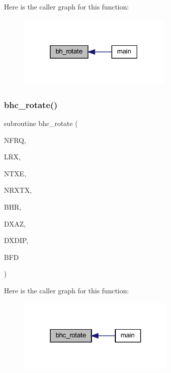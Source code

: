 Here is the caller graph for this function\+:
\nopagebreak
\begin{figure}[H]
\begin{center}
\leavevmode
\includegraphics[width=211pt]{Marco_8f90_a6f9b11cb7ed99f525d6b03e1b3223dee_icgraph}
\end{center}
\end{figure}
\mbox{\label{Marco_8f90_a88bc2c0947b2f1babf4dade8ee684423}} 
\subsubsection{\texorpdfstring{bhc\+\_\+rotate()}{bhc\_rotate()}}
{\footnotesize\ttfamily subroutine bhc\+\_\+rotate (\begin{DoxyParamCaption}\item[{integer}]{N\+F\+RQ,  }\item[{integer}]{L\+RX,  }\item[{integer}]{N\+T\+XE,  }\item[{integer, dimension(ntxe)}]{N\+R\+X\+TX,  }\item[{logical, dimension(lrx,ntxe)}]{B\+HR,  }\item[{real, dimension(lrx,ntxe)}]{D\+X\+AZ,  }\item[{real, dimension(lrx,ntxe)}]{D\+X\+D\+IP,  }\item[{complex, dimension(nfrq,lrx,ntxe,3)}]{B\+FD }\end{DoxyParamCaption})}

Here is the caller graph for this function\+:
\nopagebreak
\begin{figure}[H]
\begin{center}
\leavevmode
\includegraphics[width=216pt]{Marco_8f90_a88bc2c0947b2f1babf4dade8ee684423_icgraph}
\end{center}
\end{figure}
\mbox{\label{Marco_8f90_a0df391e311aae0e0ab61a43fe99aa856}} 
